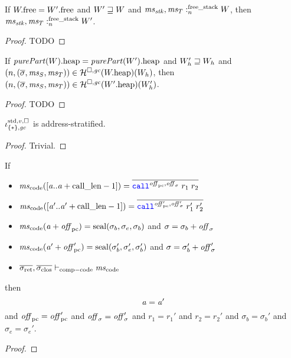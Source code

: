 \begin{lemma}
  \label{lem:stack-sat-unchanged-future}
  If $\pwfree = \pwfree[W']$ and $W' \future W$ and
  $\memSatFStack{\ms_\stk,\ms_T}{W}$, then $\memSatFStack{\ms_\stk,\ms_T}{W'}$.
\end{lemma}
\begin{proof}
  TODO
\end{proof}

\begin{lemma}
  \label{lem:heap-sat-unchanged-future}
  If $\pwheap[\purePart{W}] = \pwheap[\purePart{W'}]$ and $W_{h}' \future W_h$ and $\npair{(\overline{\sigma},\ms_S,\ms_T)} \in \lrheap(\pwheap[W])(W_h)$, then $\npair{(\overline{\sigma},\ms_S,\ms_T)} \in\lrheap(\pwheap[W'])(W_h')$.
\end{lemma}
\begin{proof}
  TODO
\end{proof}

\begin{lemma}
  \label{lem:stdreg-singleton-addr-strat}
  $\stdreg{\{*\},\gc}{v}$ is address-stratified.
\end{lemma}
\begin{proof}
  Trivial.
\end{proof}

\begin{lemma}
  \label{lem:unique-ret-seals}
  If
  \begin{itemize}
  \item $\mscode([\aaddr..\aaddr+\calllen-1]) = \overline{\scall{\offpc,\offsigma}{r_1}{r_2}}$
  \item $\mscode([\aaddr'..\aaddr'+\calllen-1]) = \overline{\scall{\offpc',\offsigma'}{r_1'}{r_2'}}$
  \item $\mscode(\aaddr + \offpc) = \seal{\sigma_b,\sigma_e,\sigma_b}$ and $\sigma = \sigma_b + \offsigma$
  \item $\mscode(\aaddr' + \offpc') = \seal{\sigma_b',\sigma_e',\sigma_b'}$ and $\sigma = \sigma_b' + \offsigma'$
  \item $\sigrets,\sigcloss \vdash_{\mathrm{comp-code}} \mscode$
  \end{itemize}
  then
  \[
    \aaddr = \aaddr'
  \]
  and $\offpc = \offpc'$ and $\offsigma = \offsigma'$ and $r_1 = r_1'$ and $r_2 = r_2'$ and $\sigma_b = \sigma_b'$ and $\sigma_e = \sigma_e'$.
\end{lemma}
\begin{proof}
\end{proof}

